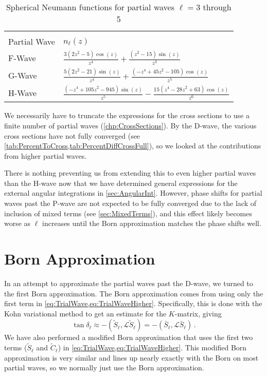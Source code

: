 \documentclass[Dissertation.tex]{subfiles}
\begin{document}
{
\renewcommand{\arraystretch}{1.5}
\begin{table}
\centering
\begin{tabular}{l l}
\toprule\\[-1.2cm]
Partial Wave & $n_\ell(z)$ \\
\midrule
F-Wave & $\frac{3 \left(2 z^2-5\right) \cos (z)}{z^4}+\frac{\left(z^2-15\right) \sin (z)}{z^3}$ \\
G-Wave & $\frac{5 \left(2 z^2-21\right) \sin (z)}{z^4}+\frac{\left(-z^4+45 z^2-105\right) \cos (z)}{z^5}$ \\
H-Wave & $\frac{\left(-z^4+105 z^2-945\right) \sin (z)}{z^5}-\frac{15 \left(z^4-28 z^2+63\right) \cos (z)}{z^6}$ \\
\bottomrule
\end{tabular}
\caption{Spherical Neumann functions for partial waves $\ell = 3$ through 5}
\label{tab:SphNeum}
\end{table}
}

We necessarily have to truncate the expressions for the cross
sections to use a finite number of partial waves (\cref{chp:CrossSections}).
By the D-wave, the various cross sections have not
fully converged (see \cref{tab:PercentToCross,tab:PercentDiffCrossFull}), so 
we looked at the contributions from higher partial waves.

There is nothing preventing us from extending this to even higher partial 
waves than the H-wave now that we have determined general expressions for the 
external angular integrations in \cref{sec:AngularInt}. However, phase shifts 
for partial waves past the P-wave are not expected to be fully converged due 
to the lack of inclusion of mixed terms (see \cref{sec:MixedTerms}), and this 
effect likely becomes worse as $\ell$ increases until the Born approximation
matches the phase shifts well.


\section{Born Approximation}
\label{sec:Born}
In an attempt to approximate the partial waves past the D-wave, we turned to 
the first Born approximation. The Born approximation comes from using only the 
first term in \cref{eq:TrialWave,eq:TrialWaveHigher}. Specifically, this is 
done with the Kohn variational method to get an estimate for the $K$-matrix, 
giving \cite[p.590]{Bransden2003}
\begin{equation}
\label{eq:Born}
\tan\delta_\ell \approx -(\widetilde{S}_\ell,\mathcal{L}\widetilde{S}_\ell ) = -(\bar{S}_\ell,\mathcal{L}\bar{S}_\ell ) \,.
\end{equation}
We have also performed a modified Born approximation that uses the first two 
terms ($\widetilde{S}_\ell$ and $\widetilde{C}_\ell$) in \cref{eq:TrialWave,eq:TrialWaveHigher}.
This modified Born approximation is very similar and lines up nearly exactly 
with the Born on most partial waves, so we normally just use the Born 
approximation.
\end{document}
